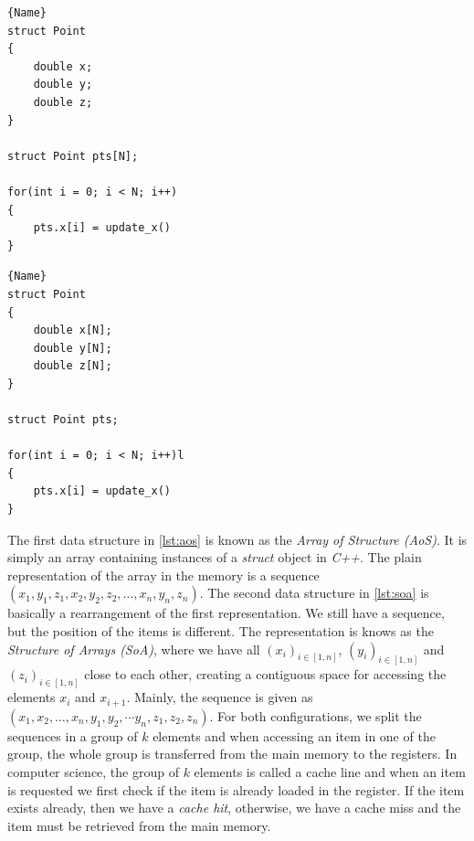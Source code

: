 \begin{minipage}{.45\textwidth}
\begin{lstlisting}[caption=Array of Structure (AoS),frame=tlrb, label=lst:aos]{Name}
struct Point
{
    double x;
    double y;
    double z;
}

struct Point pts[N];

for(int i = 0; i < N; i++)
{
    pts.x[i] = update_x()
}
\end{lstlisting}
\end{minipage}\hfill
\begin{minipage}{.45\textwidth}
\begin{lstlisting}[caption=Structure of Arrays (SoA),frame=tlrb, label=lst:soa]{Name}
struct Point
{
    double x[N];
    double y[N];
    double z[N];
}

struct Point pts;

for(int i = 0; i < N; i++)l
{
    pts.x[i] = update_x()
}

\end{lstlisting}
\end{minipage}

The first data structure in \autoref{lst:aos} is known as the \emph{Array of Structure (AoS)}. It is simply an array containing instances of a \emph{struct} object in \emph{C++}. The plain representation of the array in the memory is a sequence $(x_1, y_1, z_1, x_2, y_2, z_2, \dots, x_n, y_n, z_n)$. The second data structure in \autoref{lst:soa} is basically a rearrangement of the first representation. We still have a sequence, but the position of the items is different. The representation is knows as the \emph{Structure of Arrays (SoA)}, where we have all $(x_i)_{i \in[1, n]}$, $(y_i)_{i \in[1, n]}$ and $(z_i)_{i \in[1, n]}$ close to each other, creating a contiguous space for accessing the elements $x_i$ and $x_{i+1}$. Mainly, the sequence is given as $(x_1, x_{2}, \dots, x_n, y_1, y_{2}, \cdots y_{n}, z_1, z_2, z_n)$.  For both configurations, we split the sequences in a group of $k$ elements and when accessing an item in one of the group, the whole group is transferred from the main memory to the registers. In computer science, the group of $k$ elements is called a cache line and when an item is requested we first check if the item is already loaded in the register. If the item exists already, then we have a \emph{cache hit}, otherwise, we have a cache miss and the item must be retrieved from the main memory.

